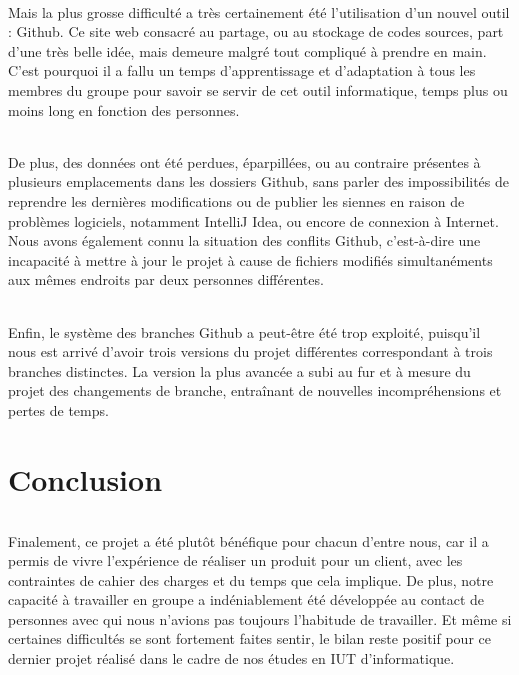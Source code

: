 \documentclass[a4paper,10pt]{report}
\begin{document}
      \paragraph{}
	Mais la plus grosse difficulté a très certainement été l'utilisation d'un nouvel outil : Github.
	Ce site web consacré au partage, ou au stockage de codes sources, part d'une très belle idée, mais demeure malgré tout compliqué à prendre en main.
	C'est pourquoi il a fallu un temps d'apprentissage et d'adaptation à tous les membres du groupe pour savoir se servir de cet outil informatique, temps plus ou moins long en fonction des personnes.

      \paragraph{}
	De plus, des données ont été perdues, éparpillées, ou au contraire présentes à plusieurs emplacements dans les dossiers Github, sans parler des impossibilités de reprendre les dernières modifications ou de publier les siennes en raison de problèmes logiciels, notamment IntelliJ Idea, ou encore de connexion à Internet.
	Nous avons également connu la situation des conflits Github, c'est-à-dire une incapacité à mettre à jour le projet à cause de fichiers modifiés simultanéments aux mêmes endroits par deux personnes différentes.

      \paragraph{}
	Enfin, le système des branches Github a peut-être été trop exploité, puisqu'il nous est arrivé d'avoir trois versions du projet différentes correspondant à trois branches distinctes. La version la plus avancée a subi au fur et à mesure du projet des changements de branche, entraînant de nouvelles incompréhensions et pertes de temps.
    
    

\part{Conclusion}
  \paragraph{}
    Finalement, ce projet a été plutôt bénéfique pour chacun d'entre nous, car il a permis de vivre l'expérience de réaliser un produit pour un client, avec les contraintes de cahier des charges et du temps que cela implique.
    De plus, notre capacité à travailler en groupe a indéniablement été développée au contact de personnes avec qui nous n'avions pas toujours l'habitude de travailler.
    Et même si certaines difficultés se sont fortement faites sentir, le bilan reste positif pour ce dernier projet réalisé dans le cadre de nos études en IUT d'informatique.
    
\end{document}
